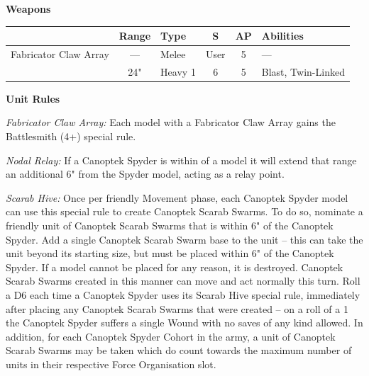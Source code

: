 \begin{minipage}[t]{0.72\textwidth}
	\vspace*{2em}
	\textbf{Weapons}
	
	\begin{tabular}{L{90 pt} c C{40pt} *{2}{c} >{\raggedright\arraybackslash}p{130pt}}
		& Range & Type & S & AP & Abilities \\
		\hline
		Fabricator Claw Array & — & Melee & User & 5 & — \\
		 & 24" & Heavy 1 & 6 & 5 & Blast, Twin-Linked \\
	\end{tabular}
	
	\vspace*{2em}
	\textbf{Unit Rules}
	
	\textit{Fabricator Claw Array:} Each model with a Fabricator Claw Array gains the Battlesmith (4+) special rule.
	
	\textit{Nodal Relay:} If a Canoptek Spyder is within  of a model it will extend that range an additional 6" from the Spyder model, acting as a relay point.
	
	\textit{Scarab Hive:} Once per friendly Movement phase, each Canoptek Spyder model can use this special rule to create Canoptek Scarab Swarms. To do so, nominate a friendly unit of Canoptek Scarab Swarms that is within 6" of the Canoptek Spyder. Add a single Canoptek Scarab Swarm base to the unit – this can take the unit beyond its starting size, but must be placed within 6" of the Canoptek Spyder. If a model cannot be placed for any reason, it is destroyed. Canoptek Scarab Swarms created in this manner can move and act normally this turn. Roll a D6 each time a Canoptek Spyder uses its Scarab Hive special rule, immediately after placing any Canoptek Scarab Swarms that were created – on a roll of a 1 the Canoptek Spyder suffers a single Wound with no saves of any kind allowed. In addition, for each Canoptek Spyder Cohort in the army, a unit of Canoptek Scarab Swarms may be taken which do count towards the maximum number of units in their respective Force Organisation slot.
	

\end{minipage}
